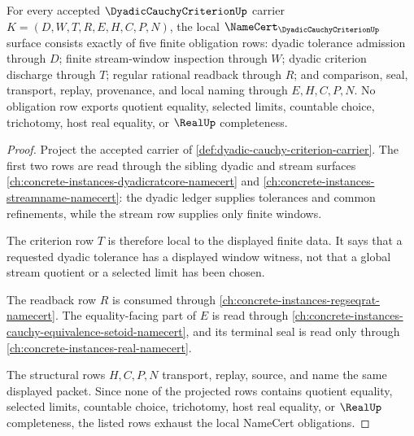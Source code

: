 \begin{theorem}
\label{thm:dyadic-cauchy-criterion-namecert-obligations}
For every accepted $\DyadicCauchyCriterionUp$ carrier $K=(D,W,T,R,E,H,C,P,N)$, the local $\NameCert_{\DyadicCauchyCriterionUp}$ surface consists exactly of five finite obligation rows: dyadic tolerance admission through $D$; finite stream-window inspection through $W$; dyadic criterion discharge through $T$; regular rational readback through $R$; and comparison, seal, transport, replay, provenance, and local naming through $E,H,C,P,N$. No obligation row exports quotient equality, selected limits, countable choice, trichotomy, host real equality, or $\RealUp$ completeness.
\end{theorem}
\begin{proof}
Project the accepted carrier of \autoref{def:dyadic-cauchy-criterion-carrier}. The first two rows are read through the sibling dyadic and stream surfaces \autoref{ch:concrete-instances-dyadicratcore-namecert} and \autoref{ch:concrete-instances-streamname-namecert}: the dyadic ledger supplies tolerances and common refinements, while the stream row supplies only finite windows.

The criterion row $T$ is therefore local to the displayed finite data. It says that a requested dyadic tolerance has a displayed window witness, not that a global stream quotient or a selected limit has been chosen.

The readback row $R$ is consumed through \autoref{ch:concrete-instances-regseqrat-namecert}. The equality-facing part of $E$ is read through \autoref{ch:concrete-instances-cauchy-equivalence-setoid-namecert}, and its terminal seal is read only through \autoref{ch:concrete-instances-real-namecert}.

The structural rows $H,C,P,N$ transport, replay, source, and name the same displayed packet. Since none of the projected rows contains quotient equality, selected limits, countable choice, trichotomy, host real equality, or $\RealUp$ completeness, the listed rows exhaust the local NameCert obligations.
\end{proof}

